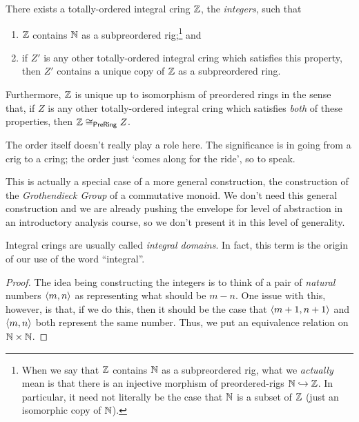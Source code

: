 \begin{thm}[Integers]\label{Integers}
There exists a totally-ordered integral cring $\Z$\index[notation]{$\Z$}, the \emph{integers}, such that
\begin{enumerate}
\item \label{enm1.2.1.1}$\Z$ contains $\mathbb{N}$ as a subpreordered rig;\footnote{When we say that $\Z$ contains $\mathbb{N}$ as a subpreordered rig, what we \emph{actually} mean is that there is an injective morphism of preordered-rigs $\mathbb{N} \hookrightarrow \mathbb{Z}$.  In particular, it need not literally be the case that $\mathbb{N}$ is a subset of $\Z$ (just an isomorphic copy of $\mathbb{N}$).} and
\item \label{enm1.2.1.2}if $Z'$ is any other totally-ordered integral cring which satisfies this property, then $Z'$ contains a unique copy of $\Z$ as a subpreordered ring.
\end{enumerate}
Furthermore, $\Z$ is unique up to isomorphism of preordered rings in the sense that, if $Z$ is any other totally-ordered integral cring which satisfies \emph{both} of these properties, then $\mathbb{Z} \cong _{\mathsf{Pre} \mathsf{Ring}}Z$.
\begin{rmk}
The order itself doesn't really play a role here.  The significance is in going from a crig to a cring; the order just `comes along for the ride', so to speak.
\end{rmk}
\begin{rmk}
This is actually a special case of a more general construction, the construction of the \emph{Grothendieck Group} of a commutative monoid.  We don't need this general construction and we are already pushing the envelope for level of abstraction in an introductory analysis course, so we don't present it in this level of generality.
\end{rmk}
\begin{rmk}
Integral crings are usually called \emph{integral domains}.  In fact, this term is the origin of our use of the word ``integral''.
\end{rmk}
\begin{proof}
The idea being constructing the integers is to think of a pair of \emph{natural} numbers $\langle m,n\rangle$ as representing what should be $m-n$.  One issue with this, however, is that, if we do this, then it should be the case that $\langle m+1,n+1\rangle$ and $\langle m,n\rangle$ both represent the same number.  Thus, we put an equivalence relation on $\mathbb{N} \times \mathbb{N}$.


\end{proof}
\end{thm}
